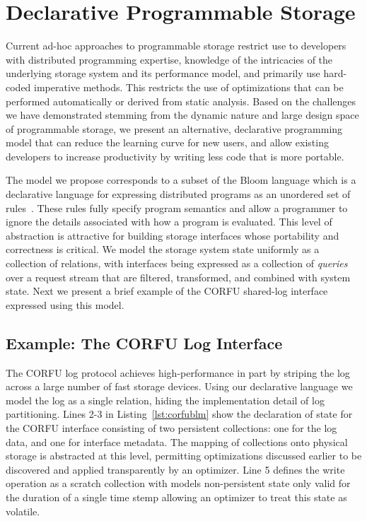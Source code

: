 \section{Declarative Programmable Storage}
\label{sec:prog-model}

Current ad-hoc approaches to programmable storage restrict use to developers
with distributed programming expertise, knowledge of the intricacies of the
underlying storage system and its performance model, and primarily use
hard-coded imperative methods. This restricts the use of optimizations that
can be performed automatically or derived from static analysis.  Based on the
challenges we have demonstrated stemming from the dynamic nature and large
design space of programmable storage, we present an alternative, declarative
programming model that can reduce the learning curve for new users, and allow
existing developers to increase productivity by writing less code that is more
portable.

The model we propose corresponds to a subset of the Bloom language which is a
declarative language for expressing distributed programs as an unordered set
of rules~\cite{alvaro:cidr11}. These rules fully specify program semantics and
allow a programmer to ignore the details associated with how a program is
evaluated. This level of abstraction is attractive for building storage
interfaces whose portability and correctness is critical. We model the
storage system state uniformly as a collection of relations, with interfaces
being expressed as a collection of \emph{queries} over a request stream that
are filtered, transformed, and combined with system state. Next we present a
brief example of the CORFU shared-log interface expressed using this model.

\subsection{Example: The CORFU Log Interface}

The CORFU log protocol achieves high-performance in part by striping the log
across a large number of fast storage devices. Using our declarative language
we model the log as a single relation, hiding the implementation detail of log
partitioning. Lines 2-3 in Listing~\ref{lst:corfublm} show the declaration of
state for the CORFU interface consisting of two persistent collections: one for
the log data, and one for interface metadata. The mapping of collections onto
physical storage is abstracted at this level, permitting optimizations
discussed earlier to be discovered and applied transparently by an optimizer.
Line 5 defines the write operation as a scratch collection with models
non-persistent state only valid for the duration of a single time stemp
allowing an optimizer to treat this state as volatile.


